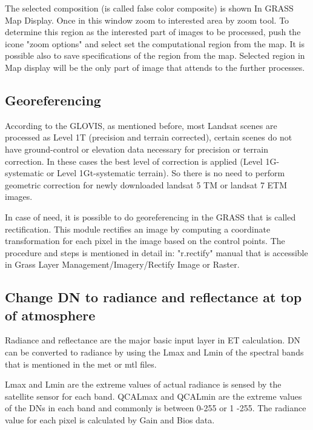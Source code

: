 The selected composition (is called false color composite) is shown In GRASS Map Display. Once in this window zoom to interested area by zoom tool. To determine this region as the interested part of images to be processed, push the icone "zoom options" and select set the computational region from the map. It is possible also to save specifications of the region from the map.
Selected region in Map display will be the only part of image that attends to the further processes.\newline

\subsection{Georeferencing} 
According to the GLOVIS, as mentioned before, most Landsat scenes are processed as Level 1T (precision and terrain corrected), certain scenes do not have ground-control or elevation data necessary for precision or terrain correction. In these cases the best level of correction is applied (Level 1G-systematic or Level 1Gt-systematic terrain). So there is no need to perform geometric correction for newly downloaded landsat 5 TM or landsat 7 ETM images.\newline

In case of need, it is possible to do georeferencing in the GRASS that is called rectification.  This module rectifies an image by computing a coordinate transformation for each pixel in the image based on the control points. The procedure and steps is mentioned in detail in: "r.rectify" manual that is accessible in Grass Layer Management/Imagery/Rectify Image or Raster.\newline

\subsection{Change DN to radiance and reflectance at top of atmosphere}
Radiance and reflectance are the major basic input layer in ET calculation. DN can be converted to radiance by using the Lmax and Lmin of the spectral bands that is mentioned in the met or mtl files.\newline

Lmax and Lmin are the extreme values of actual radiance is sensed by the satellite sensor for each band. QCALmax and QCALmin are the extreme values of the DNs in each band and commonly is between 0-255 or 1 -255. The radiance value for each pixel is calculated by Gain and Bios data.\newline

